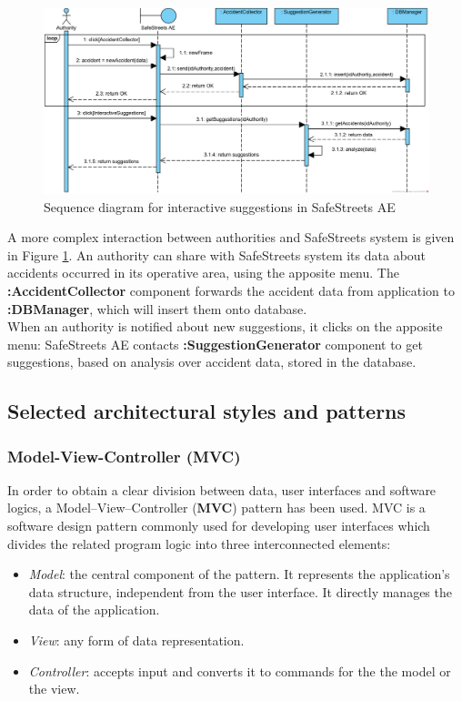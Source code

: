 \documentclass{article}
\begin{document}
			\begin{figure}[H]
				\includegraphics [scale=0.7] {diagrams/DD_SeqD_Suggestions.png}
				\caption[Sequence diagram]{Sequence diagram for interactive suggestions in SafeStreets AE}
				\label{fig:sd-suggestions}
			\end{figure}
		
			A more complex interaction between authorities and SafeStreets system is given in Figure \ref{fig:sd-suggestions}.
			An authority can share with SafeStreets system its data about accidents occurred in its operative area, using the apposite menu. The \textbf{:AccidentCollector} component forwards the accident data from application to \textbf{:DBManager}, which will insert them onto database.\\
			When an authority is notified about new suggestions, it clicks on the apposite menu: SafeStreets AE contacts \textbf{:SuggestionGenerator} component to get suggestions, based on analysis over accident data, stored in the database. 
		
		\clearpage	
		\subsection{Selected architectural styles and patterns}
			\subsubsection{Model-View-Controller (MVC)}
				In order to obtain a clear division between data, user interfaces and software logics, a
				Model–View–Controller (\textbf{MVC}) pattern has been used. MVC is a software design pattern commonly used for developing user interfaces which divides the related program logic into three interconnected elements:
				
				\begin{itemize}
					\item \textit{Model}: the central component of the pattern. It represents the application's data structure, independent from the user interface. It directly manages the data of the application.
					\item \textit{View}: any form of data representation. 
					\item \textit{Controller}: accepts input and converts it to commands for the the model or the view.
				\end{itemize}
				
\end{document}
